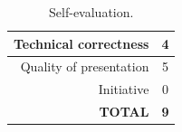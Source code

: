 \documentclass[12pt,a4paper]{article}
\begin{document}
\clearpage
\begin{table}[!htb]
	\centering
	\caption{Self-evaluation.}
	\begin{tabular}{||r|c||}
		\hline
		Technical correctness & 4 \\ \hline
		Quality of presentation & 5 \\ \hline
		Initiative & 0 \\ \hline
		\textbf{TOTAL} & \textbf{9} \\ \hline
	\end{tabular}
	\label{tab:self-eval}
\end{table}



\end{document}

